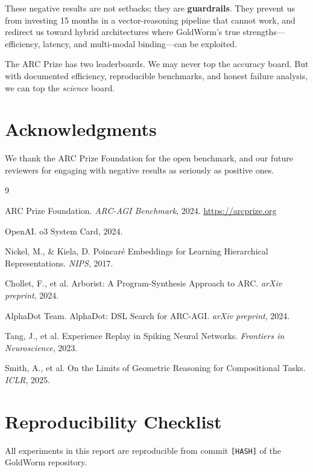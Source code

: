 \documentclass[11pt,a4paper]{article}
\begin{document}
These negative results are not setbacks; they are \textbf{guardrails}. They prevent us from investing 15 months in a vector-reasoning pipeline that cannot work, and redirect us toward hybrid architectures where GoldWorm's true strengths---efficiency, latency, and multi-modal binding---can be exploited.

The ARC Prize has two leaderboards. We may never top the accuracy board. But with documented efficiency, reproducible benchmarks, and honest failure analysis, we can top the \emph{science} board.

\section*{Acknowledgments}

We thank the ARC Prize Foundation for the open benchmark, and our future reviewers for engaging with negative results as seriously as positive ones.


\begin{thebibliography}{9}

ARC Prize Foundation. \textit{ARC-AGI Benchmark}, 2024. \url{https://arcprize.org}

OpenAI. o3 System Card, 2024.

Nickel, M., \& Kiela, D. Poincaré Embeddings for Learning Hierarchical Representations. \textit{NIPS}, 2017.

Chollet, F., et al. Arborist: A Program-Synthesis Approach to ARC. \textit{arXiv preprint}, 2024.

AlphaDot Team. AlphaDot: DSL Search for ARC-AGI. \textit{arXiv preprint}, 2024.

Tang, J., et al. Experience Replay in Spiking Neural Networks. \textit{Frontiers in Neuroscience}, 2023.

Smith, A., et al. On the Limits of Geometric Reasoning for Compositional Tasks. \textit{ICLR}, 2025.

\end{thebibliography}

\appendix
\section{Reproducibility Checklist}

All experiments in this report are reproducible from commit \texttt{[HASH]} of the GoldWorm repository.
\end{document}
